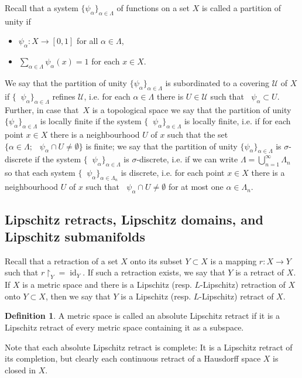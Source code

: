\documentclass[a4paper,twoside,10pt,reqno,draft]{amsart}
\theoremstyle{definition}
\newtheorem{definition}[theorem]{Definition}
\theoremstyle{remark}
\newcommand\setsep{;\allowbreak\ } %
\newcommand\al{\alpha}
\newcommand\sg{\sigma}
\newcommand\restr[1]{\mathclose\restriction_{#1}}
\newcommand\mc{\mathcal}
\DeclareMathOperator{\id}{id}
\DeclareMathOperator{\suppo}{supp_o}
\begin{document}
Recall that a system $\{\psi_\al\}_{\al\in\Lambda}$ of functions on a set $X$ is called a partition of unity if
\begin{itemize}
\item $\psi_\al\colon X\to[0,1]$ for all $\al\in\Lambda$,
\item $\sum\limits_{\al\in\Lambda}\psi_\al(x)=1$ for each $x\in X$.
\end{itemize}
We say that the partition of unity $\{\psi_\al\}_{\al\in\Lambda}$ is subordinated to a covering $\mc U$ of $X$ if $\{\suppo\psi_\al\}_{\al\in\Lambda}$ refines $\mc U$,
i.e. for each $\al\in\Lambda$ there is $U\in\mc U$ such that $\suppo\psi_\al\subset U$.
Further, in case that~$X$ is a topological space we say that the partition of unity $\{\psi_\al\}_{\al\in\Lambda}$ is locally finite if the system $\{\suppo\psi_\al\}_{\al\in\Lambda}$ is locally finite,
i.e. if for each point $x\in X$ there is a neighbourhood $U$ of $x$ such that the set $\{\al\in\Lambda\setsep\suppo\psi_\al\cap U\neq\emptyset\}$ is finite;
we say that the partition of unity $\{\psi_\al\}_{\al\in\Lambda}$ is $\sg$-discrete if the system $\{\suppo\psi_\al\}_{\al\in\Lambda}$ is $\sg$-discrete,
i.e. if we can write $\Lambda=\bigcup_{n=1}^\infty\Lambda_n$ so that each system $\{\suppo\psi_\al\}_{\al\in\Lambda_n}$ is discrete,
i.e. for each point $x\in X$ there is a neighbourhood $U$ of $x$ such that $\suppo\psi_\al\cap U\neq\emptyset$ for at most one $\al\in\Lambda_n$.

\subsection{Lipschitz retracts, Lipschitz domains, and Lipschitz submanifolds}

Recall that a retraction of a set $X$ onto its subset $Y\subset X$ is a mapping $r\colon X\to Y$ such that $r\restr Y=\id_Y$.
If such a retraction exists, we say that $Y$ is a retract of $X$.
If $X$ is a metric space and there is a Lipschitz (resp. $L$-Lipschitz) retraction of $X$ onto $Y\subset X$,
then we say that $Y$ is a Lipschitz (resp. $L$-Lipschitz) retract of $X$.

\begin{definition}
A metric space is called an absolute Lipschitz retract if it is a Lipschitz retract of every metric space containing it as a subspace.
\end{definition}

Note that each absolute Lipschitz retract is complete:
It is a Lipschitz retract of its completion, but clearly each continuous retract of a Hausdorff space $X$ is closed in $X$.
\end{document}
